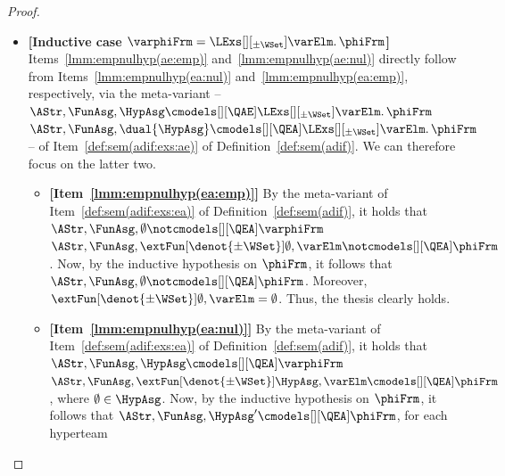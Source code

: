 \documentclass[authoryear]{elsarticle}
\newcommand{\EmpTeamAsg}{\emptyset}
\newcommand{\EmpHypAsg}{\emptyset}
\begin{document}
\begin{proof}
\begin{itemize}[$\bullet$]
\begin{itemize}
          Now, by the inductive hypothesis applied to $\phiFrm[1]$ and
          $\phiFrm[2]$, it follows that $\AStr, \FunAsg, \HypAsg'
          \notcmodels[][\QAE] \phiFrm[1]$ and $\AStr, \FunAsg, \HypAsg'
          \notcmodels[][\QAE] \phiFrm[2]$, for every hyperteam $\HypAsg'$
          such that $\EmpTeamAsg \in \HypAsg'$.
          Moreover, for every partitioning $(\HypAsg[1], \HypAsg[2]) \in
          \parFun{\HypAsg}$, one can observe that $\EmpTeamAsg \in
          \HypAsg[1]$ or $\EmpTeamAsg \in \HypAsg[2]$.
          Thus, the thesis clearly holds.
      \end{itemize}
    \item\textbf{[Inductive case $\varphiFrm = \LExs[][_{\pm\WSet}] \varElm
        \ldotp \phiFrm$]} Items~\ref{lmm:empnulhyp(ae:emp)}
      and~\ref{lmm:empnulhyp(ae:nul)} directly follow from
      Items~\ref{lmm:empnulhyp(ea:nul)} and~\ref{lmm:empnulhyp(ea:emp)},
      respectively, via the meta-variant -- $\AStr, \FunAsg, \HypAsg
      \cmodels[][\QAE] \LExs[][_{\pm\WSet}] \varElm \ldotp \phiFrm$ \iff $\AStr,
      \FunAsg, \dual{\HypAsg} \cmodels[][\QEA] \LExs[][_{\pm\WSet}] \varElm
      \ldotp \phiFrm$ -- of Item~\ref{def:sem(adif:exs:ae)} of
      Definition~\ref{def:sem(adif)}.
      We can therefore focus on the latter two.
      \begin{itemize}
      \item\textbf{[Item~\ref{lmm:empnulhyp(ea:emp)}]}
        By the meta-variant of Item~\ref{def:sem(adif:exs:ea)} of
        Definition~\ref{def:sem(adif)}, it holds that $\AStr, \FunAsg,
        \EmpHypAsg \notcmodels[][\QEA] \varphiFrm$ \iff $\AStr, \FunAsg,
        \extFun[\denot{\pm\WSet}]{\EmpHypAsg, \varElm} \notcmodels[][\QEA]
        \phiFrm$.
          Now, by the inductive hypothesis on $\phiFrm$, it follows that $\AStr,
          \FunAsg, \EmpHypAsg \notcmodels[][\QEA] \phiFrm$.
          Moreover, $\extFun[\denot{\pm\WSet}]{\EmpHypAsg, \varElm} =
          \EmpHypAsg$.
          Thus, the thesis clearly holds.
        \item\textbf{[Item~\ref{lmm:empnulhyp(ea:nul)}]}
          By the meta-variant of Item~\ref{def:sem(adif:exs:ea)} of
          Definition~\ref{def:sem(adif)}, it holds that $\AStr, \FunAsg, \HypAsg
          \cmodels[][\QEA] \varphiFrm$ \iff $\AStr, \FunAsg,
          \extFun[\denot{\pm\WSet}]{\HypAsg, \varElm} \cmodels[][\QEA] \phiFrm$,
          where $\EmpTeamAsg \in \HypAsg$.
          Now, by the inductive hypothesis on $\phiFrm$, it follows that $\AStr,
          \FunAsg, \HypAsg' \cmodels[][\QEA] \phiFrm$, for each hyperteam

\end{itemize}
\end{itemize}
\end{proof}
\end{document}
